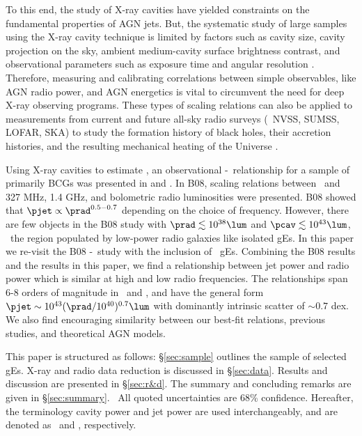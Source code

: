 \documentclass{emulateapj}
\begin{document}
To this end, the study of X-ray cavities have yielded constraints on
the fundamental properties of AGN jets. But, the systematic study of
large samples using the X-ray cavity technique is limited by factors
such as cavity size, cavity projection on the sky, ambient
medium-cavity surface brightness contrast, and observational
parameters such as exposure time and angular resolution
\citep{2009arXiv0909.0397B}. Therefore, measuring and calibrating
correlations between simple observables, like AGN radio power, and AGN
energetics is vital to circumvent the need for deep X-ray observing
programs. These types of scaling relations can also be applied to
measurements from current and future all-sky radio surveys (\eg\ NVSS,
SUMSS, LOFAR, SKA) to study the formation history of black holes,
their accretion histories, and the resulting mechanical heating of the
Universe \citep{croton06, 2006MNRAS.366..397S}.

Using X-ray cavities to estimate \pjet, an observational
\pjet-\prad\ relationship for a sample of primarily BCGs was presented
in \citet[][hereafter B04]{birzan04} and \citet[][hereafter
  B08]{birzan08}. In B08, scaling relations between \pjet\ and 327
MHz, 1.4 GHz, and bolometric radio luminosities were presented. B08
showed that $\pjet \propto \prad^{0.5-0.7}$ depending on the choice of
frequency. However, there are few objects in the B08 study with $\prad
\lesssim 10^{38} \lum$ and $\pcav \lesssim 10^{43} \lum$, \ie\ the
region populated by low-power radio galaxies like isolated gEs. In
this paper we re-visit the B08 \pjet-\prad\ study with the inclusion
of \samp\ gEs. Combining the B08 results and the results in this
paper, we find a relationship between jet power and radio power which
is similar at high and low radio frequencies. The relationships span
6-8 orders of magnitude in \pjet\ and \prad, and have the general form
$\pjet \sim 10^{43} (\prad/10^{40})^{0.7} \lum$ with dominantly
intrinsic scatter of $\sim 0.7$ dex. We also find encouraging
similarity between our best-fit relations, previous studies, and
theoretical AGN models.

This paper is structured as follows: \S\ref{sec:sample} outlines the
sample of selected gEs. X-ray and radio data reduction is discussed in
\S\ref{sec:data}. Results and discussion are presented in
\S\ref{sec:r&d}. The summary and concluding remarks are given in
\S\ref{sec:summary}. \LCDM\ All quoted uncertainties are 68\%
confidence. Hereafter, the terminology cavity power and jet power are
used interchangeably, and are denoted as \pcav\ and \pjet,
respectively.
\end{document}

